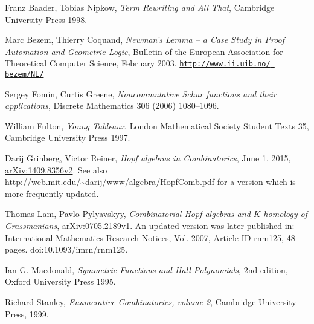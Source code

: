 \documentclass[numbers=enddot,12pt,final,onecolumn,notitlepage]{scrartcl}%
\theoremstyle{definition}
\begin{document}
\begin{thebibliography}{99999999}                                                                                         %


Franz Baader, Tobias Nipkow, \textit{Term
Rewriting and All That}, Cambridge University Press 1998.

Marc Bezem, Thierry Coquand, \textit{Newman's Lemma
-- a Case Study in Proof Automation and Geometric Logic}, Bulletin of the
European Association for Theoretical Computer Science, February 2003.\newline%
\texttt{\href{http://www.ii.uib.no/~bezem/NL/}{http://www.ii.uib.no/%
bezem/NL/}}

Sergey Fomin, Curtis Greene, \textit{Noncommutative
Schur functions and their applications}, Discrete Mathematics 306 (2006) 1080--1096.

William Fulton, \textit{Young Tableaux}, London
Mathematical Society Student Texts 35, Cambridge University Press 1997.

Darij Grinberg, Victor Reiner, \textit{Hopf
algebras in Combinatorics}, June 1, 2015,
\href{http://arxiv.org/abs/1409.8356v2}{arXiv:1409.8356v2}. \newline See also
\url{http://web.mit.edu/~darij/www/algebra/HopfComb.pdf} for a version which
is more frequently updated.

Thomas Lam, Pavlo Pylyavskyy, \textit{Combinatorial
Hopf algebras and }$K$\textit{-homology of Grassmanians},
\href{http://arxiv.org/abs/0705.2189v1}{arXiv:0705.2189v1}. An updated version
was later published in: International Mathematics Research Notices, Vol. 2007,
Article ID rnm125, 48 pages. doi:10.1093/imrn/rnm125.

Ian G. Macdonald, \textit{Symmetric Functions and
Hall Polynomials}, 2nd edition, Oxford University Press 1995.

Richard Stanley, \textit{Enumerative Combinatorics,
volume 2}, Cambridge University Press, 1999.
\end{thebibliography}
\end{document}
